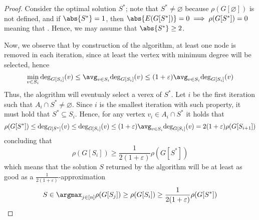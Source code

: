 \documentclass[a4paper, 12pt]{report}
\begin{document}
    \begin{proof}
        Consider the optimal solution $S^*$; note that $S^* \neq \varnothing$ because $\rho(G[\varnothing])$ is not defined, and if $\abs{S^*} = 1$, then $\abs{E(G[S^*])} = 0 \implies \rho(G[S^*]) = 0$ meaning that . Hence, we may assume that $\abs{S^*} \ge 2$.
        

        Now, we observe that by construction of the algorithm, at least one node is removed in each iteration, since at least the vertex with minimum degree will be selected, hence $$\min_{v \in S_i}{\deg_{G[S_i]}(v)} \le \avg_{v \in S_i}{\deg_{G[S_i]}(v)} \le (1 + \varepsilon) \avg_{v \in S_i}{\deg_{G[S_i]}(v)}$$ Thus, the alogrithm will eventualy select a verex of $S^*$. Let $i$ be the first iteration such that $A_i \cap S^* \neq \varnothing$. Since $i$ is the smallest iteration with such property, it must hold that $S^* \subseteq S_i$. Hence, for any vertex $v_i \in A_i \cap S^*$ it holds that $$\rho(G[S^*]) \le \deg_{G[S^*]}(v) \le \deg_{G[S_i]}(v) \le (1 + \varepsilon) \avg_{v \in S_i}{\deg_{G[S_i]}(v)} = 2 (1 + \varepsilon) \rho(G[S_{i + 1}])$$ concluding that $$\rho(G[S_i]) \ge \dfrac{1}{2(1 + \varepsilon)}\rho(G[S^*])$$ which means that the solution $S$ returned by the algorithm will be at least as good as a $\tfrac{1}{2 (1 + \varepsilon)}$-approximation $$S \in \argmax_{j \in [n]}{\rho(G[S_j])} \ge \rho(G[S_i]) \ge \dfrac{1}{2(1 + \varepsilon)} \rho(G[S^*])$$


\end{proof}
\end{document}
